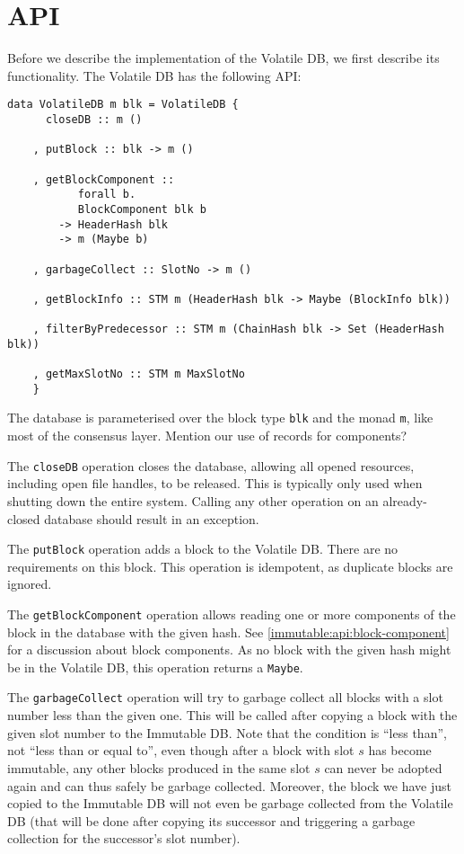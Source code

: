 \section{API}
\label{volatile:api}

Before we describe the implementation of the Volatile DB, we first describe its
functionality. The Volatile DB has the following API:

\begin{lstlisting}
data VolatileDB m blk = VolatileDB {
      closeDB :: m ()

    , putBlock :: blk -> m ()

    , getBlockComponent ::
           forall b.
           BlockComponent blk b
        -> HeaderHash blk
        -> m (Maybe b)

    , garbageCollect :: SlotNo -> m ()

    , getBlockInfo :: STM m (HeaderHash blk -> Maybe (BlockInfo blk))

    , filterByPredecessor :: STM m (ChainHash blk -> Set (HeaderHash blk))

    , getMaxSlotNo :: STM m MaxSlotNo
    }
\end{lstlisting}

The database is parameterised over the block type \lstinline!blk! and the monad
\lstinline!m!, like most of the consensus layer.
 Mention our use of records for components?

The \lstinline!closeDB! operation closes the database, allowing all opened
resources, including open file handles, to be released. This is typically only
used when shutting down the entire system. Calling any other operation on an
already-closed database should result in an exception.

The \lstinline!putBlock! operation adds a block to the Volatile DB. There are no
requirements on this block. This operation is idempotent, as duplicate blocks
are ignored.

The \lstinline!getBlockComponent! operation allows reading one or more
components of the block in the database with the given hash. See
\cref{immutable:api:block-component} for a discussion about block components. As
no block with the given hash might be in the Volatile DB, this operation returns
a \lstinline!Maybe!.

The \lstinline!garbageCollect! operation will try to garbage collect all blocks
with a slot number less than the given one. This will be called after copying a
block with the given slot number to the Immutable DB. Note that the condition is
``less than'', not ``less than or equal to'', even though after a block with
slot $s$ has become immutable, any other blocks produced in the same slot $s$
can never be adopted again and can thus safely be garbage collected. Moreover,
the block we have just copied to the Immutable DB will not even be garbage
collected from the Volatile DB (that will be done after copying its successor
and triggering a garbage collection for the successor's slot number).

